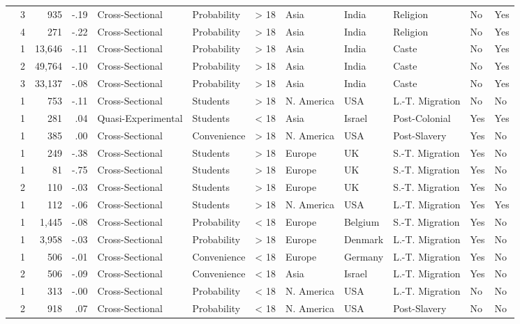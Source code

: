 \documentclass[10pt, letterpaper]{article}
\begin{document}
\begin{landscape}
\begin{xltabular}{650pt}{Xrrrllrlllll}
 & 3 & 935 & -.19 & Cross-Sectional & Probability & > 18 & Asia & India & Religion & No & Yes\\
 & 4 & 271 & -.22 & Cross-Sectional & Probability & > 18 & Asia & India & Religion & No & Yes\\
\cite{2392} & 1 & 13,646 & -.11 & Cross-Sectional & Probability & > 18 & Asia & India & Caste & No & Yes\\
 & 2 & 49,764 & -.10 & Cross-Sectional & Probability & > 18 & Asia & India & Caste & No & Yes\\
 & 3 & 33,137 & -.08 & Cross-Sectional & Probability & > 18 & Asia & India & Caste & No & Yes\\
\cite{1891} & 1 & 753 & -.11 & Cross-Sectional & Students & > 18 & N. America & USA & L.-T. Migration & No & No\\
\cite{789} & 1 & 281 & .04 & Quasi-Experimental & Students & < 18 & Asia & Israel & Post-Colonial & Yes & Yes\\
\cite{3060} & 1 & 385 & .00 & Cross-Sectional & Convenience & > 18 & N. America & USA & Post-Slavery & Yes & No\\
\cite{733} & 1 & 249 & -.38 & Cross-Sectional & Students & > 18 & Europe & UK & S.-T. Migration & Yes & No\\
\cite{1020} & 1 & 81 & -.75 & Cross-Sectional & Students & > 18 & Europe & UK & S.-T. Migration & Yes & No\\
 & 2 & 110 & -.03 & Cross-Sectional & Students & > 18 & Europe & UK & S.-T. Migration & Yes & No\\
\cite{2375} & 1 & 112 & -.06 & Cross-Sectional & Students & > 18 & N. America & USA & L.-T. Migration & Yes & Yes\\
\cite{46} & 1 & 1,445 & -.08 & Cross-Sectional & Probability & < 18 & Europe & Belgium & S.-T. Migration & Yes & No\\
\cite{1412} & 1 & 3,958 & -.03 & Cross-Sectional & Probability & > 18 & Europe & Denmark & L.-T. Migration & Yes & No\\
\cite{1966} & 1 & 506 & -.01 & Cross-Sectional & Convenience & < 18 & Europe & Germany & L.-T. Migration & Yes & No\\
 & 2 & 506 & -.09 & Cross-Sectional & Convenience & < 18 & Asia & Israel & L.-T. Migration & Yes & No\\
\cite{1221} & 1 & 313 & -.00 & Cross-Sectional & Probability & < 18 & N. America & USA & L.-T. Migration & No & No\\
 & 2 & 918 & .07 & Cross-Sectional & Probability & < 18 & N. America & USA & Post-Slavery & No & No\\

\end{xltabular}
\end{landscape}
\end{document}
